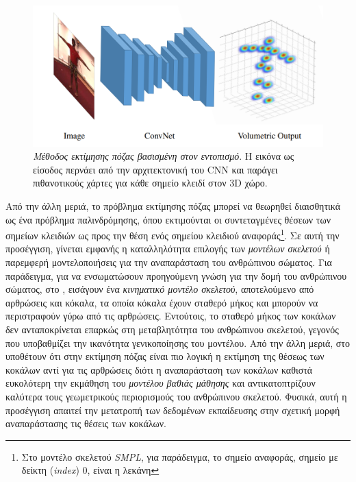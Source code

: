 \begin{figure}[h]
    \centering
    \includegraphics[scale=0.4]{images/chapter2/3d_pose_estimation/pavlakos_architecture.png}
    \caption[Μέθοδος εκτίμησης πόζας βασισμένη στον εντοπισμό]{\textsl{Μέθοδος εκτίμησης πόζας βασισμένη στον εντοπισμό}. Η εικόνα ως είσοδος περνάει από την αρχιτεκτονική του CNN και παράγει πιθανοτικούς χάρτες για κάθε σημείο κλειδί στον 3D χώρο.}
    \label{fig:pavlakos_architecture}
\end{figure}

Από την άλλη μεριά, το πρόβλημα εκτίμησης πόζας μπορεί να θεωρηθεί διαισθητικά ως ένα πρόβλημα παλινδρόμησης,  όπου εκτιμούνται οι συντεταγμένες θέσεων των σημείων κλειδιών ως προς την θέση ενός σημείου κλειδιού αναφοράς\footnote{Στο μοντέλο σκελετού \textsl{SMPL}, για παράδειγμα, το σημείο αναφοράς, σημείο με δείκτη (\textsl{index}) 0, είναι η λεκάνη}. Σε αυτή την προσέγγιση, γίνεται εμφανής η καταλληλότητα επιλογής των \textsl{μοντέλων σκελετού} ή παρεμφερή μοντελοποιήσεις για την αναπαράσταση του ανθρώπινου σώματος. Για παράδειγμα, για να ενσωματώσουν προηγούμενη γνώση για την δομή του ανθρώπινου σώματος, στο \cite{kinematic_pose_regression_paper}, εισάγουν ένα \textsl{κινηματικό μοντέλο σκελετού}, αποτελούμενο από αρθρώσεις και κόκαλα, τα οποία κόκαλα έχουν σταθερό μήκος και μπορούν να περιστραφούν γύρω από τις αρθρώσεις. Εντούτοις, το σταθερό μήκος των κοκάλων δεν ανταποκρίνεται επαρκώς στη μεταβλητότητα του ανθρώπινου σκελετού, γεγονός που υποβαθμίζει την ικανότητα γενικοποίησης του μοντέλου. Από την άλλη μεριά, στο \cite{composition_human_pose_regression} υποθέτουν ότι στην εκτίμηση πόζας είναι πιο λογική η εκτίμηση της θέσεως των κοκάλων αντί για τις αρθρώσεις διότι η αναπαράσταση των κοκάλων καθιστά ευκολότερη την εκμάθηση του \textsl{μοντέλου βαθιάς μάθησης} και αντικατοπτρίζουν καλύτερα τους γεωμετρικούς περιορισμούς του ανθρώπινου σκελετού. Φυσικά, αυτή η προσέγγιση απαιτεί την μετατροπή των δεδομένων εκπαίδευσης στην σχετική μορφή αναπαράστασης τις θέσεις των κοκάλων. 

